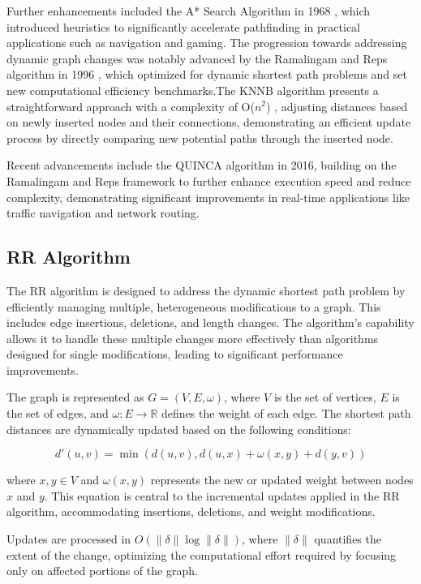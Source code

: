 \documentclass[conference]{IEEEtran}
\begin{document}
Further enhancements included the A* Search Algorithm in 1968 \cite{koenig2004lifelong}, which introduced heuristics to significantly accelerate pathfinding in practical applications such as navigation and gaming. The progression towards addressing dynamic graph changes was notably advanced by the Ramalingam and Reps algorithm in 1996 \cite{}, which optimized for dynamic shortest path problems and set new computational efficiency benchmarks.The KNNB algorithm \cite{Khopkar2014EfficientAF} presents a straightforward approach with a complexity of O($n^2$)
, adjusting distances based on newly inserted nodes and their connections, demonstrating an efficient update process by directly comparing new potential paths through the inserted node.

Recent advancements include the QUINCA algorithm in 2016, building on the Ramalingam and Reps framework \cite{10.1006/jagm.1996.0046} to further enhance execution speed and reduce complexity, demonstrating significant improvements in real-time applications like traffic navigation and network routing.

\subsection{RR Algorithm}
The RR algorithm is designed to address the dynamic shortest path problem by efficiently managing multiple, heterogeneous modifications to a graph. This includes edge insertions, deletions, and length changes. The algorithm's capability allows it to handle these multiple changes more effectively than algorithms designed for single modifications, leading to significant performance improvements.

The graph is represented as \( G = (V, E, \omega) \), where \( V \) is the set of vertices, \( E \) is the set of edges, and \( \omega: E \to \mathbb{R} \) defines the weight of each edge. The shortest path distances are dynamically updated based on the following conditions:

\[
d'(u, v) = \min \left(d(u, v), d(u, x) + \omega(x, y) + d(y, v)\right)
\]

where \( x, y \in V \) and \( \omega(x, y) \) represents the new or updated weight between nodes \( x \) and \( y \). This equation is central to the incremental updates applied in the RR algorithm, accommodating insertions, deletions, and weight modifications.

Updates are processed in \( O(\|\delta\| \log \|\delta\|) \), where \( \|\delta\| \) quantifies the extent of the change, optimizing the computational effort required by focusing only on affected portions of the graph.
\end{document}
